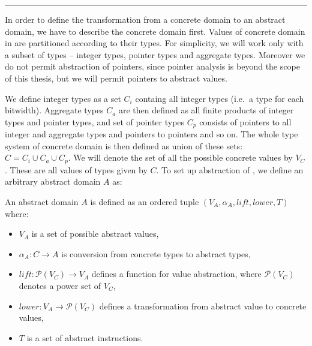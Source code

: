 \hrule

\bigskip

In order to define the transformation from a concrete domain to an abstract
domain, we have to describe the concrete domain first. Values of concrete domain
in \LLVM are partitioned according to their types. For simplicity, we will work
only with a subset of \LLVM types -- integer types, pointer types and aggregate
types. Moreover we do not permit abstraction of pointers, since pointer analysis is
beyond the scope of this thesis, but we will permit pointers to abstract values.

We define integer types as a set $C_{i}$ containg all \LLVM integer
types (i.e.~a type for each bitwidth).
Aggregate types $C_a$ are then defined as all finite products of integer types and
pointer types, and set of pointer types $C_p$ consists of pointers to all integer
and aggregate types and pointers to pointers and so on. The whole type system of concrete domain is
then defined as union of these sets: $C = C_i \cup C_a \cup C_p$. We will denote
the set of all the possible concrete values by $V_C$. These are all \LLVM values
of types given by $C$. To set up abstraction of \LLVM, we define an arbitrary
abstract domain $A$ as:
\begin{definition}
An abstract domain $A$ is defined as an ordered tuple $(V_A,\alpha_A, lift, lower,
    T)$ where:
\begin{itemize}
    \item $V_A$ is a set of possible abstract values,
    \item $\alpha_A \colon C \to A$ is conversion from concrete types to
        abstract types,
    \item $\textit{lift} \colon \mathcal{P}(V_C) \to V_A$ defines a function for
        value abstraction, where $\mathcal{P}(V_C)$ denotes a power set of
        $V_C$,
    \item $\textit{lower} \colon V_A \to \mathcal{P}(V_C)$ defines a
        transformation from abstract value to concrete values,
    \item $T$ is a set of abstract instructions.
\end{itemize}

\end{definition}


